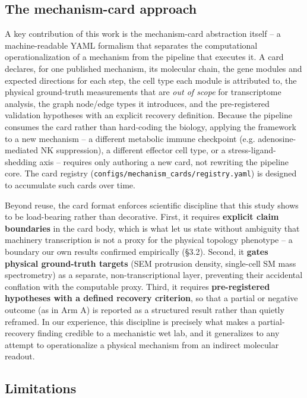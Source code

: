 \documentclass[modern,large,numbered,nocrop]{oup-authoring-template}
\begin{document}
\subsection{The mechanism-card approach}

A key contribution of this work is the mechanism-card abstraction itself -- a machine-readable YAML formalism that separates the computational operationalization of a mechanism from the pipeline that executes it. A card declares, for one published mechanism, its molecular chain, the gene modules and expected directions for each step, the cell type each module is attributed to, the physical ground-truth measurements that are \textit{out of scope} for transcriptome analysis, the graph node/edge types it introduces, and the pre-registered validation hypotheses with an explicit recovery definition. Because the pipeline consumes the card rather than hard-coding the biology, applying the framework to a new mechanism -- a different metabolic immune checkpoint (e.g. adenosine-mediated NK suppression), a different effector cell type, or a stress-ligand-shedding axis -- requires only authoring a new card, not rewriting the pipeline core. The card registry (\texttt{configs/mechanism\_cards/registry.yaml}) is designed to accumulate such cards over time.

Beyond reuse, the card format enforces scientific discipline that this study shows to be load-bearing rather than decorative. First, it requires \textbf{explicit claim boundaries} in the card body, which is what let us state without ambiguity that machinery transcription is not a proxy for the physical topology phenotype -- a boundary our own results confirmed empirically (\S{}3.2). Second, it \textbf{gates physical ground-truth targets} (SEM protrusion density, single-cell SM mass spectrometry) as a separate, non-transcriptional layer, preventing their accidental conflation with the computable proxy. Third, it requires \textbf{pre-registered hypotheses with a defined recovery criterion}, so that a partial or negative outcome (as in Arm A) is reported as a structured result rather than quietly reframed. In our experience, this discipline is precisely what makes a partial-recovery finding credible to a mechanistic wet lab, and it generalizes to any attempt to operationalize a physical mechanism from an indirect molecular readout.

\subsection{Limitations}
\end{document}
